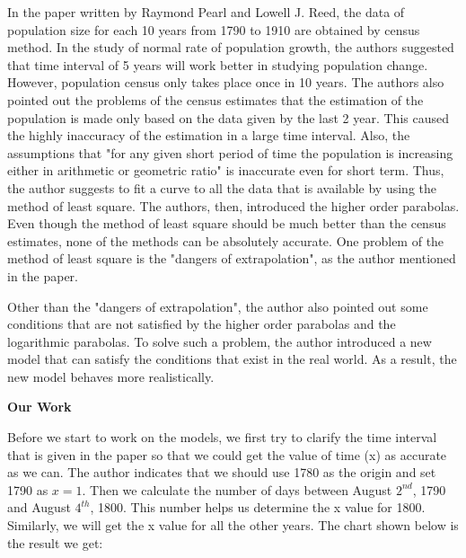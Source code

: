 \documentclass[a4paper]{article}
\begin{document}
In the paper written by Raymond Pearl and Lowell J. Reed, the data of population size for each 10 years from 1790 to 1910 are obtained by census method. In the study of normal rate of population growth, the authors suggested that time interval of 5 years will work better in studying population change. However, population census only takes place once in 10 years. The authors also pointed out the problems of the census estimates that the estimation of the population is made only based on the data given by the last 2 year. This caused the highly inaccuracy of the estimation in a large time interval. Also, the assumptions that "for any given short period of time the population is increasing either in arithmetic or geometric ratio" is inaccurate even for short term. Thus, the author suggests to fit a curve to all the data that is available by using the method of least square. The authors, then, introduced the higher order parabolas. Even though the method of least square should be much better than the census estimates, none of the methods can be absolutely accurate. One problem of the method of least square is the "dangers of extrapolation", as the author mentioned in the paper.\

Other than the "dangers of extrapolation", the author also pointed out some conditions that are not satisfied by the higher order parabolas and the logarithmic parabolas. To solve such a problem, the author introduced a new model that can satisfy the conditions that exist in the real world. As a result, the new model behaves more realistically.\

\vspace{10mm}

\begin{center}

\textbf{\large{Our Work}} \\

\end{center}
 
Before we start to work on the models, we first try to clarify the time interval that is given in the paper so that we could get the value of time (x) as accurate as we can. The author indicates that we should use 1780 as the origin and set 1790 as $x = 1$. Then we calculate the number of days between August $2^{nd}$, 1790 and August $4^{th}$, 1800. This number helps us determine the x value for 1800. Similarly, we will get the x value for all the other years. The chart shown below is the result we get: \
\end{document}
